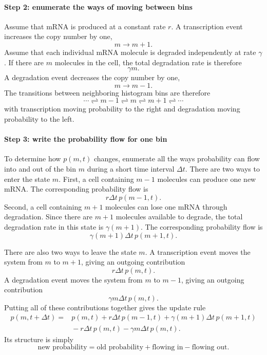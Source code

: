 \paragraph{Step 2: enumerate the ways of moving between bins}
Assume that mRNA is produced at a constant rate $r$.
% 
A transcription event increases the copy number by one,
% 
\[
    m \longrightarrow m+1.
\]
% 
Assume that each individual mRNA molecule is degraded independently at rate $\gamma$.
% 
If there are $m$ molecules in the cell, the total degradation rate is therefore
% 
\[
    \gamma m.
\]
% 
A degradation event decreases the copy number by one,
% 
\[
    m \longrightarrow m-1.
\]
% 
The transitions between neighboring histogram bins are therefore
% 
\[
    \cdots \rightleftharpoons m-1 \rightleftharpoons m \rightleftharpoons m+1 \rightleftharpoons \cdots
\]
% 
with transcription moving probability to the right and degradation moving probability to the left.
\\
% 
% 
\paragraph{Step 3: write the probability flow for one bin}
To determine how $p(m,t)$ changes, enumerate all the ways probability can flow into and out of the bin $m$ during a short time interval $\Delta t$.
There are two ways to enter the state $m$.
First, a cell containing $m-1$ molecules can produce one new mRNA.
The corresponding probability flow is
\[
    r\Delta t\,p(m-1,t).
\]
Second, a cell containing $m+1$ molecules can lose one mRNA through degradation.
Since there are $m+1$ molecules available to degrade, the total degradation rate in this state is $\gamma(m+1)$.
The corresponding probability flow is
\[
    \gamma(m+1)\Delta t\,p(m+1,t).
\]

There are also two ways to leave the state $m$.
A transcription event moves the system from $m$ to $m+1$, giving an outgoing contribution
\[
    r\Delta t\,p(m,t).
\]
A degradation event moves the system from $m$ to $m-1$, giving an outgoing contribution
\[
    \gamma m\Delta t\,p(m,t).
\]
Putting all of these contributions together gives the update rule
\[
    \begin{aligned}
        p(m,t+\Delta t)={}&p(m,t)+r\Delta t\,p(m-1,t)+\gamma(m+1)\Delta t\,p(m+1,t)
        \\
        &{}-r\Delta t\,p(m,t)-\gamma m\Delta t\,p(m,t).
    \end{aligned}
\]
Its structure is simply
\[
    \text{new probability}=\text{old probability}+\text{flowing in}-\text{flowing out}.
\]
% 
% 
